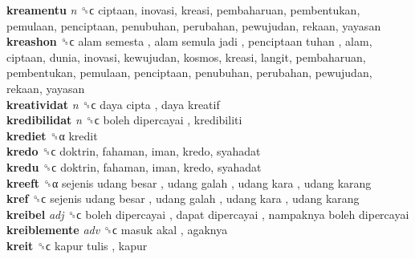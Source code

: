 \textbf{kreamentu} \emph{n}  ␝ϲ  ciptaan, inovasi, kreasi, pembaharuan, pembentukan, pemulaan, penciptaan, penubuhan, perubahan, pewujudan, rekaan, yayasan  \\
\textbf{kreashon} ␝ϲ   alam semesta ,  alam semula jadi ,  penciptaan tuhan , alam, ciptaan, dunia, inovasi, kewujudan, kosmos, kreasi, langit, pembaharuan, pembentukan, pemulaan, penciptaan, penubuhan, perubahan, pewujudan, rekaan, yayasan  \\
\textbf{kreatividat} \emph{n}  ␝ϲ   daya cipta ,  daya kreatif   \\
\textbf{kredibilidat} \emph{n}  ␝ϲ   boleh dipercayai , kredibiliti  \\
\textbf{krediet} ␝α  kredit  \\
\textbf{kredo} ␝ϲ  doktrin, fahaman, iman, kredo, syahadat  \\
\textbf{kredu} ␝ϲ  doktrin, fahaman, iman, kredo, syahadat  \\
\textbf{kreeft} ␝α   sejenis udang besar ,  udang galah ,  udang kara ,  udang karang   \\
\textbf{kref} ␝ϲ   sejenis udang besar ,  udang galah ,  udang kara ,  udang karang   \\
\textbf{kreibel} \emph{adj}  ␝ϲ   boleh dipercayai ,  dapat dipercayai ,  nampaknya boleh dipercayai   \\
\textbf{kreiblemente} \emph{adv}  ␝ϲ   masuk akal , agaknya  \\
\textbf{kreit} ␝ϲ   kapur tulis , kapur  \\
